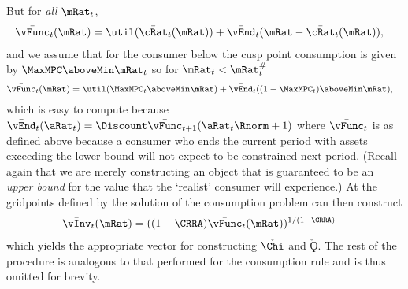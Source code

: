   But for \textit{all} $\mRat_{t}$,
  \begin{equation*}\begin{gathered}\begin{aligned}
    \bar{\vFunc}_{t}(\mRat)  & = \util(\bar{\cRat}_{t}(\mRat))+ \bar{\vEnd}_{t}(\mRat-\bar{\cRat}_{t}(\mRat)),
  \end{aligned}\end{gathered}\end{equation*}
  and we assume that for the consumer below the cusp point consumption is given by $\MaxMPC \aboveMin \mRat_{t}$ so for $\mRat_{t}< \mtCusp$
  \begin{equation*}\begin{gathered}\begin{aligned}
    \bar{\vFunc}_{t}(\mRat)  & = \util( \MaxMPC_{t} \aboveMin \mRat)+ \bar{\vEnd}_{t}((1-\MaxMPC_{t})\aboveMin \mRat),
  \end{aligned}\end{gathered}\end{equation*}
  which is easy to compute because $\bar{\vEnd}_{t}(\aRat_{t}) = \Discount \bar{\vFunc}_{t+1}(\aRat_{t}\Rnorm+1)$
  where $\bar{\vFunc}_{t}$ is as defined above because a consumer who ends the current period with assets exceeding
  the lower bound will not expect to be constrained next period.  (Recall again that we are merely constructing an object that is guaranteed to be an \textit{upper bound} for the value that the `realist' consumer will experience.)  At the gridpoints defined by the solution of the
  consumption problem can then construct
  \begin{equation*}\begin{gathered}\begin{aligned}
    \bar{\vInv}_{t}(\mRat)  & = ((1-\CRRA)\bar{\vFunc}_{t}(\mRat))^{1/(1-\CRRA)}
  \end{aligned}\end{gathered}\end{equation*}
   which yields the appropriate vector for constructing $\check{\Chi}$ and $\check{\Koppa}$.  The rest of the procedure is analogous to that performed for the consumption rule and is thus omitted for brevity.

